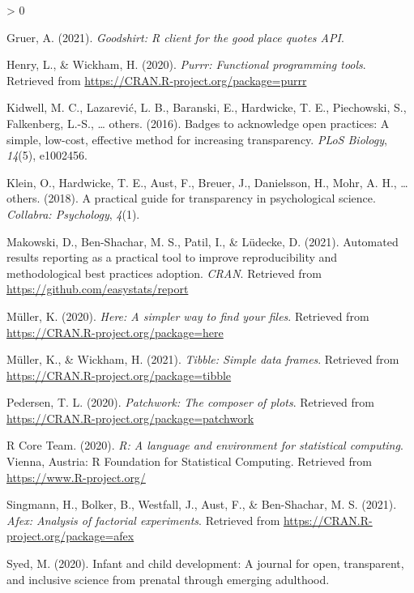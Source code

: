 \documentclass[
  english,
  man,floatsintext]{apa6}
\newlength{\cslhangindent}
\newenvironment{CSLReferences}[2] %
 {%
  \setlength{\parindent}{0pt}
  \ifodd #1 \everypar{\setlength{\hangindent}{\cslhangindent}}\ignorespaces\fi
  \ifnum #2 > 0
  \setlength{\parskip}{#2\baselineskip}
  \fi
 }%
 {}
\begin{document}
\begin{CSLReferences}{1}{0}
\leavevmode\hypertarget{ref-R-goodshirt}{}%
Gruer, A. (2021). \emph{Goodshirt: R client for the good place quotes API}.

\leavevmode\hypertarget{ref-R-purrr}{}%
Henry, L., \& Wickham, H. (2020). \emph{Purrr: Functional programming tools}. Retrieved from \url{https://CRAN.R-project.org/package=purrr}

\leavevmode\hypertarget{ref-kidwell2016badges}{}%
Kidwell, M. C., Lazarević, L. B., Baranski, E., Hardwicke, T. E., Piechowski, S., Falkenberg, L.-S., \ldots{} others. (2016). Badges to acknowledge open practices: A simple, low-cost, effective method for increasing transparency. \emph{PLoS Biology}, \emph{14}(5), e1002456.

\leavevmode\hypertarget{ref-klein2018practical}{}%
Klein, O., Hardwicke, T. E., Aust, F., Breuer, J., Danielsson, H., Mohr, A. H., \ldots{} others. (2018). A practical guide for transparency in psychological science. \emph{Collabra: Psychology}, \emph{4}(1).

\leavevmode\hypertarget{ref-R-report}{}%
Makowski, D., Ben-Shachar, M. S., Patil, I., \& Lüdecke, D. (2021). Automated results reporting as a practical tool to improve reproducibility and methodological best practices adoption. \emph{CRAN}. Retrieved from \url{https://github.com/easystats/report}

\leavevmode\hypertarget{ref-R-here}{}%
Müller, K. (2020). \emph{Here: A simpler way to find your files}. Retrieved from \url{https://CRAN.R-project.org/package=here}

\leavevmode\hypertarget{ref-R-tibble}{}%
Müller, K., \& Wickham, H. (2021). \emph{Tibble: Simple data frames}. Retrieved from \url{https://CRAN.R-project.org/package=tibble}

\leavevmode\hypertarget{ref-R-patchwork}{}%
Pedersen, T. L. (2020). \emph{Patchwork: The composer of plots}. Retrieved from \url{https://CRAN.R-project.org/package=patchwork}

\leavevmode\hypertarget{ref-R-base}{}%
R Core Team. (2020). \emph{R: A language and environment for statistical computing}. Vienna, Austria: R Foundation for Statistical Computing. Retrieved from \url{https://www.R-project.org/}

\leavevmode\hypertarget{ref-R-afex}{}%
Singmann, H., Bolker, B., Westfall, J., Aust, F., \& Ben-Shachar, M. S. (2021). \emph{Afex: Analysis of factorial experiments}. Retrieved from \url{https://CRAN.R-project.org/package=afex}

\leavevmode\hypertarget{ref-syed2020infant}{}%
Syed, M. (2020). Infant and child development: A journal for open, transparent, and inclusive science from prenatal through emerging adulthood.


\end{CSLReferences}
\end{document}
